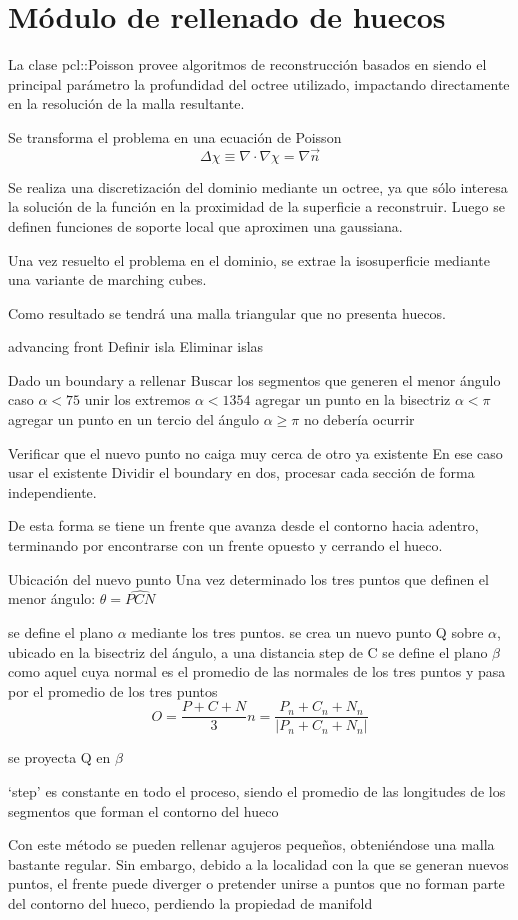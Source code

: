 \chapter{Módulo de rellenado de huecos}
	La clase pcl::Poisson provee algoritmos de reconstrucción basados en %
	siendo el principal parámetro la profundidad del octree utilizado,
	impactando directamente en la resolución de la malla resultante.


	Se transforma el problema en una ecuación de Poisson
	\[\Delta\chi \equiv \nabla \cdot\nabla\chi = \nabla \vec{n}\]

	Se realiza una discretización del dominio mediante un octree, ya que sólo
	interesa la solución de la función en la proximidad de la superficie a
	reconstruir.
	Luego se definen funciones de soporte local que aproximen una gaussiana.

	Una vez resuelto el problema en el dominio, se extrae la isosuperficie mediante una variante de marching cubes.

	Como resultado se tendrá una malla triangular que no presenta huecos.


	advancing front
	Definir isla
	Eliminar islas

	Dado un boundary a rellenar
		Buscar los segmentos que generen el menor ángulo
		caso $\alpha < 75$
			unir los extremos
		$\alpha < 1354$
			agregar un punto en la bisectriz
		$\alpha < \pi$
			agregar un punto en un tercio del ángulo
		$\alpha \geq \pi$
			no debería ocurrir

		Verificar que el nuevo punto no caiga muy cerca de otro ya existente
		En ese caso usar el existente
			Dividir el boundary en dos, procesar cada sección de forma independiente.

		De esta forma se tiene un frente que avanza desde el contorno hacia adentro, terminando por encontrarse con un frente opuesto y cerrando el hueco.


	Ubicación del nuevo punto
		Una vez determinado los tres puntos que definen el menor ángulo: 
			$\theta = \widehat{PCN}$

		se define el plano $\alpha$ mediante los tres puntos.
		se crea un nuevo punto Q sobre $\alpha$, ubicado en la bisectriz del ángulo, a una distancia step de C
		se define el plano $\beta$ como aquel cuya normal es el promedio de las normales de los tres puntos y pasa por el promedio de los tres puntos
		\[
		O = \frac{P+C+N}{3}
		n = \frac{P_n + C_n + N_n} {|P_n + C_n + N_n|}
		\]

		se proyecta Q en $\beta$

		`step' es constante en todo el proceso, siendo el promedio de las longitudes de los segmentos que forman el contorno del hueco


		Con este método se pueden rellenar agujeros pequeños, obteniéndose una malla bastante regular.
		Sin embargo, debido a la localidad con la que se generan nuevos puntos, el frente puede diverger o pretender unirse a puntos que no forman parte del contorno del hueco, perdiendo la propiedad de manifold
